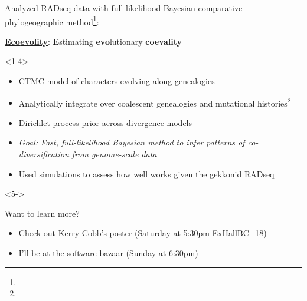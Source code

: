 % 
\begin{frame}[t]

    \vspace{0.04\textheight}
    Analyzed RADseq data with full-likelihood Bayesian comparative phylogeographic method\footnote{\tiny{}}:

    \begin{center}
        \LARGE
        \href{https://github.com/phyletica/ecoevolity}{
            \textbf{\textcolor{pgreen}{E}\textcolor{pteal}{co\textcolor{pauburn}{evo}lity}}}:
        \textcolor{pgreen}{\bf E}stimating \textcolor{pauburn}{\bf evo}lutionary \textcolor{pteal}{\bf coevality}
    \end{center}

    \begin{onlyenv}<1-4>
    \begin{itemize}
        \item<2-> CTMC model of characters evolving along genealogies
        \item<2-> Analytically integrate over coalescent genealogies and
            mutational histories\footnote{\tiny{}}
        \item<2-> Dirichlet-process prior across divergence models

        \bigskip
        \item<3-> \textsl{Goal: Fast, full-likelihood Bayesian method to infer
                patterns of co-diversification from genome-scale data}
        \item<4-> Used simulations to assess how well \ecoevolity works given
            the gekkonid RADseq \datasets
    \end{itemize}
    \end{onlyenv}

    \begin{onlyenv}<5->
    \bigskip
    \begin{center}

    {\LARGE Want to learn more?}

    \bigskip
    \begin{itemize}
        \item<5-> Check out Kerry Cobb's poster (Saturday at 5:30pm ExHallBC\_18)
        \item<5-> I'll be at the software bazaar (Sunday at 6:30pm)
    \end{itemize}
    \end{center}
    \end{onlyenv}
\end{frame}

